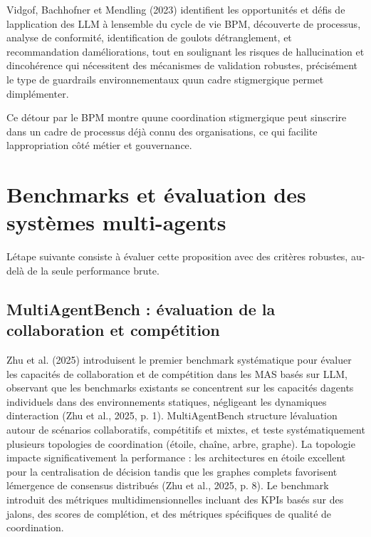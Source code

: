 \documentclass[12pt,a4paper]{article}
\begin{document}
Vidgof, Bachhofner et Mendling (2023) identifient les opportunités et
défis de l\textquotesingle application des LLM à
l\textquotesingle ensemble du cycle de vie BPM, découverte de
processus, analyse de conformité, identification de goulots
d\textquotesingle étranglement, et recommandation
d\textquotesingle améliorations, tout en soulignant les risques de
hallucination et d\textquotesingle incohérence qui nécessitent des
mécanismes de validation robustes, précisément le type de guardrails
environnementaux qu\textquotesingle un cadre stigmergique permet
d\textquotesingle implémenter.

Ce détour par le BPM montre qu\textquotesingle une coordination
stigmergique peut s\textquotesingle inscrire dans un cadre de processus
déjà connu des organisations, ce qui facilite
l\textquotesingle appropriation côté métier et gouvernance.

\section{Benchmarks et évaluation des systèmes
multi-agents}\label{benchmarks-et-uxe9valuation-des-systuxe8mes-multi-agents}

L\textquotesingle étape suivante consiste à évaluer cette proposition
avec des critères robustes, au-delà de la seule performance brute.

\subsection{MultiAgentBench : évaluation de la collaboration et
compétition}\label{multiagentbench--uxe9valuation-de-la-collaboration-et-compuxe9tition}

Zhu et al. (2025) introduisent le premier benchmark systématique pour
évaluer les capacités de collaboration et de compétition dans les MAS
basés sur LLM, observant que les benchmarks existants se concentrent sur
les capacités d\textquotesingle agents individuels dans des
environnements statiques, négligeant les dynamiques
d\textquotesingle interaction (Zhu et al., 2025, p. 1). MultiAgentBench
structure l\textquotesingle évaluation autour de scénarios
collaboratifs, compétitifs et mixtes, et teste systématiquement
plusieurs topologies de coordination (étoile, chaîne, arbre, graphe). La
topologie impacte significativement la performance : les architectures
en étoile excellent pour la centralisation de décision tandis que les
graphes complets favorisent l\textquotesingle émergence de consensus
distribués (Zhu et al., 2025, p. 8). Le benchmark introduit des
métriques multidimensionnelles incluant des KPIs basés sur des jalons,
des scores de complétion, et des métriques spécifiques de qualité de
coordination.
\end{document}
